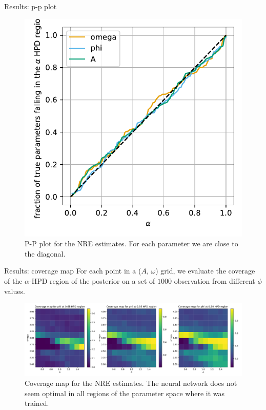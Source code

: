 \documentclass{beamer}
\begin{document}
\begin{frame}{Results: p-p plot}
    \begin{figure}
        \centering
        \includegraphics[height=0.7\textheight]{../figures/pp_plot_light_v2.pdf}
        \caption{P-P plot for the NRE estimates. For each parameter we are close to the diagonal.}
        \label{fig:pp_plot}
    \end{figure}
\end{frame}
\begin{frame}{Results: coverage map}
For each point in a ($A$, $\omega$) grid, we evaluate the coverage of the $\alpha$-HPD region of the posterior on a set of $1000$ observation from 
different $\phi$ values. 
    \begin{figure}
        \centering
        \includegraphics[width=\textwidth]{../figures/coverage_map_light_v2.pdf}
        \caption{Coverage map for the NRE estimates. The neural network does not seem optimal in all regions of the parameter space where it was trained.}
        \label{fig:coverage_map}
    \end{figure}
\end{frame}
\end{document}
